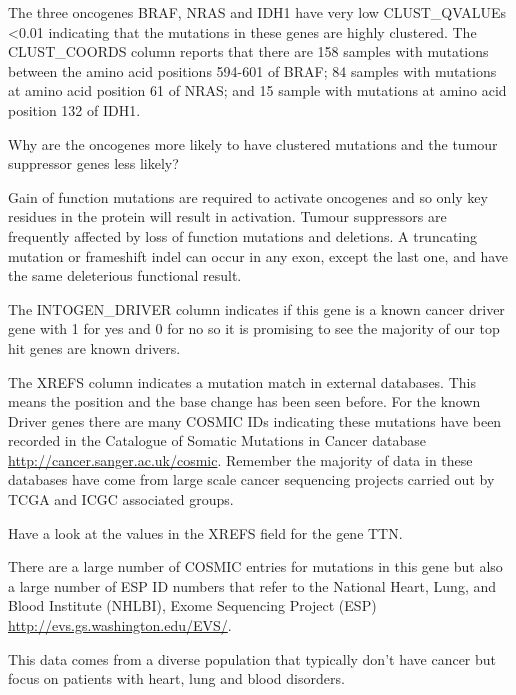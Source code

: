 The three oncogenes BRAF, NRAS and IDH1 have very low CLUST\_QVALUEs <0.01 indicating
that the mutations in these genes are highly clustered. The CLUST\_COORDS column reports
that there are 158 samples with mutations between the amino acid positions 594-601 of
BRAF; 84 samples with mutations at amino acid position 61 of NRAS; and 15 sample with
mutations at amino acid position 132 of IDH1.

\begin{questions} 
Why are the oncogenes more likely to have clustered mutations and the tumour suppressor genes less likely?
\end{questions}

\begin{answer}
Gain of function mutations are required to activate oncogenes and so only key residues in the protein
will result in activation. Tumour suppressors are frequently affected by loss of function mutations
and deletions. A truncating mutation or frameshift indel can occur in any exon, except the last one,
and have the same deleterious functional result.
\end{answer}

\begin{information}
The INTOGEN\_DRIVER column indicates if this gene is a known cancer driver gene with 1 for yes and
0 for no so it is promising to see the majority of our top hit genes are known drivers.

The XREFS column indicates a mutation match in external databases. This means the position and
the base change has been seen before. For the known Driver genes there are many COSMIC IDs indicating
these mutations have been recorded in the Catalogue of Somatic Mutations in Cancer database
\url{http://cancer.sanger.ac.uk/cosmic}. Remember the majority of data in these databases have come from
large scale cancer sequencing projects carried out by TCGA and ICGC associated groups.
\end{information}

\begin{steps}
Have a look at the values in the XREFS field for the gene TTN.
\end{steps}

There are a large number of COSMIC entries for mutations in this gene but also a large number
of ESP ID numbers that refer to the National Heart, Lung, and Blood Institute (NHLBI),
Exome Sequencing Project (ESP) \url{http://evs.gs.washington.edu/EVS/}.

\begin{information}
This data comes from a diverse population that typically don't have cancer but focus on patients
with heart, lung and blood disorders.
\end{information}

